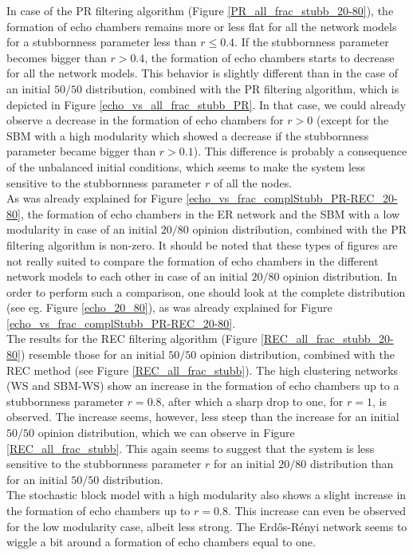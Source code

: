 \documentclass[11 pt , letterpaper , twoside , openright]{book}
\begin{document}
In case of the PR filtering algorithm (Figure \ref{PR_all_frac_stubb_20-80}), the formation of echo chambers remains more or less flat for all the network models for a stubbornness parameter less than $r \leqslant 0.4$. If the stubbornness parameter becomes bigger than $r > 0.4$, the formation of echo chambers starts to decrease for all the network models. This behavior is slightly different than in the case of an initial $50/50$ distribution, combined with the PR filtering algorithm, which is depicted in Figure \ref{echo_vs_all_frac_stubb_PR}. In that case, we could already observe a decrease in the formation of echo chambers for $r > 0$ (except for the SBM with a high modularity which showed a decrease if the stubbornness parameter became bigger than $r>0.1$). This difference is probably a consequence of the unbalanced initial conditions, which seems to make the system less sensitive to the stubbornness parameter $r$ of all the nodes.\\
As was already explained for Figure \ref{echo_vs_frac_complStubb_PR-REC_20-80}, the formation of echo chambers in the ER network and the SBM with a low modularity in case of an initial $20/80$ opinion distribution, combined with the PR filtering algorithm is non-zero. It should be noted that these types of figures are not really suited to compare the formation of echo chambers in the different network models to each other in case of an initial $20/80$ opinion distribution. In order to perform such a comparison, one should look at the complete distribution (see eg. Figure \ref{echo_20_80}), as was already explained for Figure \ref{echo_vs_frac_complStubb_PR-REC_20-80}.\\
\newline
The results for the REC filtering algorithm (Figure \ref{REC_all_frac_stubb_20-80}) resemble those for an initial $50/50$ opinion distribution, combined with the REC method (see Figure \ref{REC_all_frac_stubb}). The high clustering networks (WS and SBM-WS) show an increase in the formation of echo chambers up to a stubbornness parameter $r=0.8$, after which a sharp drop to one, for $r=1$, is observed. The increase seems, however, less steep than the increase for an initial $50/50$ opinion distribution, which we can observe in Figure \ref{REC_all_frac_stubb}. This again seems to suggest that the system is less sensitive to the stubbornness parameter $r$ for an initial $20/80$ distribution than for an initial $50/50$ distribution.\\
The stochastic block model with a high modularity also shows a slight increase in the formation of echo chambers up to $r = 0.8$. This increase can even be observed for the low modularity case, albeit less strong. The Erd\H{o}s-R\'{e}nyi network seems to wiggle a bit around a formation of echo chambers equal to one.
\end{document}
